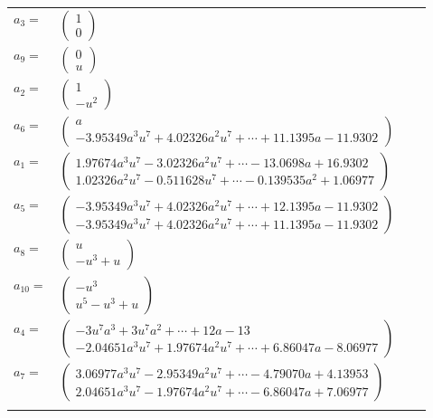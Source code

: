 \documentclass[1p]{elsarticle_modified}
\theoremstyle{definition}
\begin{document}
\begin{tabular}{m{7pt} m{180pt} m{7pt} m{180pt} }
\flushright $a_{3}=$&$\begin{pmatrix}1\\0\end{pmatrix}$ \\
\flushright $a_{9}=$&$\begin{pmatrix}0\\u\end{pmatrix}$ \\
\flushright $a_{2}=$&$\begin{pmatrix}1\\- u^2\end{pmatrix}$ \\
\flushright $a_{6}=$&$\begin{pmatrix}a\\-3.95349 a^{3} u^{7}+4.02326 a^{2} u^{7}+\cdots+11.1395 a-11.9302\end{pmatrix}$ \\
\flushright $a_{1}=$&$\begin{pmatrix}1.97674 a^{3} u^{7}-3.02326 a^{2} u^{7}+\cdots-13.0698 a+16.9302\\1.02326 a^{2} u^{7}-0.511628 u^{7}+\cdots-0.139535 a^{2}+1.06977\end{pmatrix}$ \\
\flushright $a_{5}=$&$\begin{pmatrix}-3.95349 a^{3} u^{7}+4.02326 a^{2} u^{7}+\cdots+12.1395 a-11.9302\\-3.95349 a^{3} u^{7}+4.02326 a^{2} u^{7}+\cdots+11.1395 a-11.9302\end{pmatrix}$ \\
\flushright $a_{8}=$&$\begin{pmatrix}u\\- u^3+u\end{pmatrix}$ \\
\flushright $a_{10}=$&$\begin{pmatrix}- u^3\\u^5- u^3+u\end{pmatrix}$ \\
\flushright $a_{4}=$&$\begin{pmatrix}-3 u^7 a^3+3 u^7 a^2+\cdots+12 a-13\\-2.04651 a^{3} u^{7}+1.97674 a^{2} u^{7}+\cdots+6.86047 a-8.06977\end{pmatrix}$ \\
\flushright $a_{7}=$&$\begin{pmatrix}3.06977 a^{3} u^{7}-2.95349 a^{2} u^{7}+\cdots-4.79070 a+4.13953\\2.04651 a^{3} u^{7}-1.97674 a^{2} u^{7}+\cdots-6.86047 a+7.06977\end{pmatrix}$\\&\end{tabular}
\end{document}
